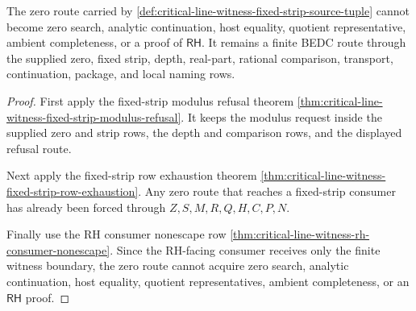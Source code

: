 \begin{theorem}
\label{thm:critical-line-witness-zero-route-nonescape}
The zero route carried by \autoref{def:critical-line-witness-fixed-strip-source-tuple} cannot become zero search, analytic continuation, host equality, quotient representative, ambient completeness, or a proof of $\mathsf{RH}$. It remains a finite BEDC route through the supplied zero, fixed strip, depth, real-part, rational comparison, transport, continuation, package, and local naming rows.
\end{theorem}
\begin{proof}
First apply the fixed-strip modulus refusal theorem \autoref{thm:critical-line-witness-fixed-strip-modulus-refusal}. It keeps the modulus request inside the supplied zero and strip rows, the depth and comparison rows, and the displayed refusal route.

Next apply the fixed-strip row exhaustion theorem \autoref{thm:critical-line-witness-fixed-strip-row-exhaustion}. Any zero route that reaches a fixed-strip consumer has already been forced through $Z,S,M,R,Q,H,C,P,N$.

Finally use the RH consumer nonescape row \autoref{thm:critical-line-witness-rh-consumer-nonescape}. Since the RH-facing consumer receives only the finite witness boundary, the zero route cannot acquire zero search, analytic continuation, host equality, quotient representatives, ambient completeness, or an $\mathsf{RH}$ proof.
\end{proof}


